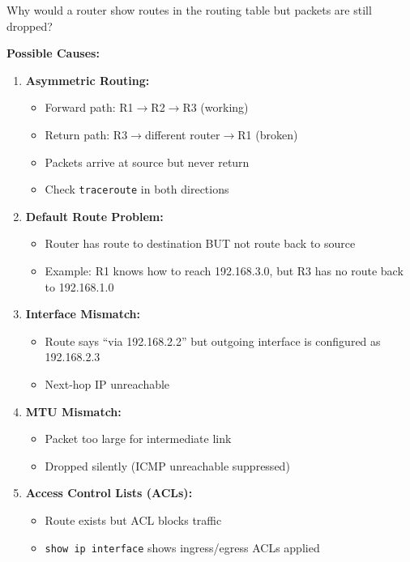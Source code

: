 \documentclass[12pt,a4paper]{article}
\begin{document}

\begin{qbox}{Why would a router show routes in the routing table but packets are still dropped?}
\end{qbox}

\begin{abox}
\textbf{Possible Causes:}

\begin{enumerate}
    \item \textbf{Asymmetric Routing:}
    \begin{itemize}
        \item Forward path: R1$\rightarrow$R2$\rightarrow$R3 (working)
        \item Return path: R3$\rightarrow$different router$\rightarrow$R1 (broken)
        \item Packets arrive at source but never return
        \item Check \texttt{traceroute} in both directions
    \end{itemize}

    \item \textbf{Default Route Problem:}
    \begin{itemize}
        \item Router has route to destination BUT not route back to source
        \item Example: R1 knows how to reach 192.168.3.0, but R3 has no route back to 192.168.1.0
    \end{itemize}

    \item \textbf{Interface Mismatch:}
    \begin{itemize}
        \item Route says ``via 192.168.2.2'' but outgoing interface is configured as 192.168.2.3
        \item Next-hop IP unreachable
    \end{itemize}

    \item \textbf{MTU Mismatch:}
    \begin{itemize}
        \item Packet too large for intermediate link
        \item Dropped silently (ICMP unreachable suppressed)
    \end{itemize}

    \item \textbf{Access Control Lists (ACLs):}
    \begin{itemize}
        \item Route exists but ACL blocks traffic
        \item \texttt{show ip interface} shows ingress/egress ACLs applied
    \end{itemize}
\end{enumerate}


\end{abox}
\end{document}
